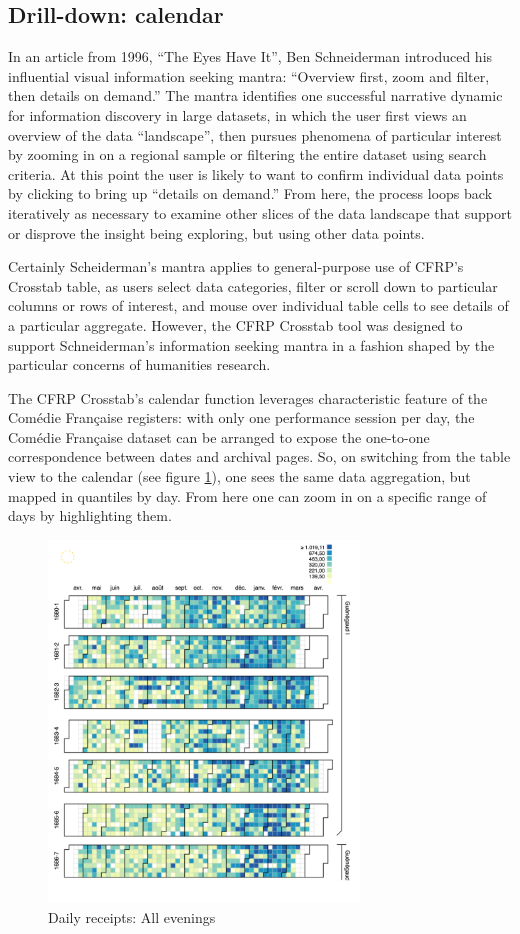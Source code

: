 \documentclass[	DIV=calc,%
							paper=a4,%
							fontsize=11pt,%
							twocolumn]{scrartcl}	 					%
\begin{document}
\subsection*{Drill-down: calendar}

In an article from 1996, ``The Eyes Have It'', Ben Schneiderman introduced his influential visual information seeking mantra: ``Overview first, zoom and filter, then details on demand.''\cite{Shneiderman:1996}  The mantra identifies one successful narrative dynamic for information discovery in large datasets, in which the user first views an overview of the data ``landscape'', then pursues phenomena of particular interest by zooming in on a regional sample or filtering the entire dataset using search criteria.  At this point the user is likely to want to confirm individual data points by clicking to bring up ``details on demand.''  From here, the process loops back iteratively as necessary to examine other slices of the data landscape that support or disprove the insight being exploring, but using other data points.

Certainly Scheiderman’s mantra applies to general-purpose use of CFRP’s Crosstab table, as users select data categories, filter or scroll down to particular columns or rows of interest, and mouse over individual table cells to see details of a particular aggregate.  However, the CFRP Crosstab tool was designed to support Schneiderman’s information seeking mantra in a fashion shaped by the particular concerns of humanities research.

The CFRP Crosstab’s calendar function leverages characteristic feature of the Comédie Française registers: with only one performance session per day, the Comédie Française dataset can be arranged to expose the one-to-one correspondence between dates and archival pages.  So, on switching from the table view to the calendar (see figure \ref{fig:calendar-receipts}), one sees the same data aggregation, but mapped in quantiles by day.  From here one can zoom in on a specific range of days by highlighting them.

\begin{figure}
  \centering
	\includegraphics[width=3.25in]{steps/calendar-receipts.png}
	\caption{Daily receipts: All evenings}
	\label{fig:calendar-receipts}
\end{figure}
\end{document}
